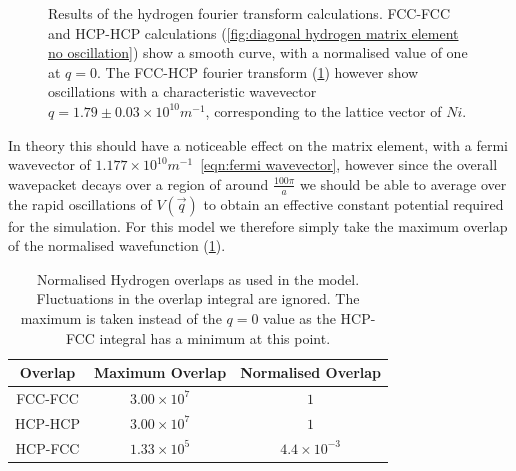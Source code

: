 \begin{figure}[htbp]
\begin{subfigure}{0.45\linewidth}
        \label{fig:cross hydrogen matrix element oscillation}
    \end{subfigure}
    \caption{Results of the hydrogen fourier transform calculations.
    FCC-FCC and HCP-HCP calculations
    (\cref{fig:diagonal hydrogen matrix element no oscillation})
    show a smooth curve, with a normalised
    value of one at \(q=0\).
    The FCC-HCP fourier transform
    (\cref{fig:cross hydrogen matrix element oscillation})
    however show oscillations with a characteristic
    wavevector \(q = 1.79 \pm 0.03 \times{}10^{10}m^{-1}\),
    corresponding to the lattice vector of \(Ni\).}\label{fig:fourier transform oscillation}
\end{figure}
In theory this should have a noticeable
effect on the matrix element, with a
fermi wavevector of
\(1.177\times{}10^{10} m^{-1}\)~\cref{eqn:fermi wavevector},
however since the overall wavepacket decays over a region
of around \(\frac{100\pi}{a}\) we should be
able to average over the rapid oscillations of
\(V(\vec{q})\) to obtain an effective constant
potential required for the simulation. For this
model we therefore simply take the maximum overlap
of the normalised wavefunction (\cref{tab:hydrogen overlaps}).
\begin{table}[htbp]
    \begin{center}
        \begin{tabular}{ *{3}{c} }
            \toprule
            Overlap & Maximum Overlap        & Normalised Overlap     \\
            \midrule
            FCC-FCC & \(3.00\times{}10^{7}\) & \(1\)                  \\
            HCP-HCP & \(3.00\times{}10^{7}\) & \(1\)                  \\
            HCP-FCC & \(1.33\times{}10^{5}\) & \(4.4\times{}10^{-3}\) \\
            \bottomrule
        \end{tabular}
    \end{center}
    \caption{Normalised Hydrogen overlaps as used in the
        model. Fluctuations in the overlap
        integral are ignored. The maximum
        is taken instead of the \(q=0\) value as the HCP-FCC integral
        has a minimum at this point.}\label{tab:hydrogen overlaps}
\end{table}

